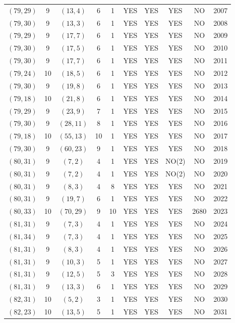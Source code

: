 \begin{longtable}{|c|c|c|c|c|c|c|c|c|c|}
$(79, 29)$ & 9 & $(13, 4)$ & 6 & 1 & YES & YES & YES & NO & 2007\\
$(79, 30)$ & 9 & $(13, 3)$ & 6 & 1 & YES & YES & YES & NO & 2008\\
$(79, 29)$ & 9 & $(17, 7)$ & 6 & 1 & YES & YES & YES & NO & 2009\\
$(79, 30)$ & 9 & $(17, 5)$ & 6 & 1 & YES & YES & YES & NO & 2010\\
$(79, 30)$ & 9 & $(17, 7)$ & 6 & 1 & YES & YES & YES & NO & 2011\\
$(79, 24)$ & 10 & $(18, 5)$ & 6 & 1 & YES & YES & YES & NO & 2012\\
$(79, 30)$ & 9 & $(19, 8)$ & 6 & 1 & YES & YES & YES & NO & 2013\\
$(79, 18)$ & 10 & $(21, 8)$ & 6 & 1 & YES & YES & YES & NO & 2014\\
$(79, 29)$ & 9 & $(23, 9)$ & 7 & 1 & YES & YES & YES & NO & 2015\\
$(79, 30)$ & 9 & $(28, 11)$ & 8 & 1 & YES & YES & YES & NO & 2016\\
$(79, 18)$ & 10 & $(55, 13)$ & 10 & 1 & YES & YES & YES & NO & 2017\\
$(79, 30)$ & 9 & $(60, 23)$ & 9 & 1 & YES & YES & YES & NO & 2018\\
$(80, 31)$ & 9 & $(7, 2)$ & 4 & 1 & YES & YES & NO(2) & NO & 2019\\
$(80, 31)$ & 9 & $(7, 2)$ & 4 & 1 & YES & YES & NO(2) & NO & 2020\\
$(80, 31)$ & 9 & $(8, 3)$ & 4 & 8 & YES & YES & YES & NO & 2021\\
$(80, 31)$ & 9 & $(19, 7)$ & 6 & 1 & YES & YES & YES & NO & 2022\\
$(80, 33)$ & 10 & $(70, 29)$ & 9 & 10 & YES & YES & YES & 2680 & 2023\\
$(81, 31)$ & 9 & $(7, 3)$ & 4 & 1 & YES & YES & YES & NO & 2024\\
$(81, 34)$ & 9 & $(7, 3)$ & 4 & 1 & YES & YES & YES & NO & 2025\\
$(81, 31)$ & 9 & $(8, 3)$ & 4 & 1 & YES & YES & YES & NO & 2026\\
$(81, 31)$ & 9 & $(10, 3)$ & 5 & 1 & YES & YES & YES & NO & 2027\\
$(81, 31)$ & 9 & $(12, 5)$ & 5 & 3 & YES & YES & YES & NO & 2028\\
$(81, 31)$ & 9 & $(13, 3)$ & 6 & 1 & YES & YES & YES & NO & 2029\\
$(82, 31)$ & 10 & $(5, 2)$ & 3 & 1 & YES & YES & YES & NO & 2030\\
$(82, 23)$ & 10 & $(13, 5)$ & 5 & 1 & YES & YES & YES & NO & 2031\\

\end{longtable}
